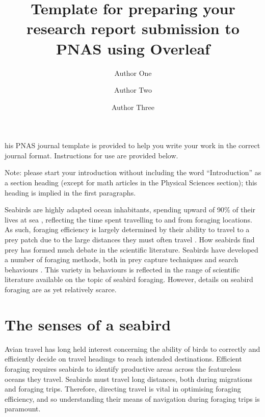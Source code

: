 \documentclass[9pt,twocolumn,twoside,lineno]{pnas-new}
\title{Template for preparing your research report submission to PNAS using Overleaf}
\author[a,c,1]{Author One}
\author[b,1,2]{Author Two}
\author[a]{Author Three}
\affil[a]{Affiliation One}
\affil[b]{Affiliation Two}
\affil[c]{Affiliation Three}
\begin{document}
\maketitle
\thispagestyle{firststyle}

his PNAS journal template is provided to help you write your work in the correct journal format. Instructions for use are provided below. 

Note: please start your introduction without including the word ``Introduction'' as a section heading (except for math articles in the Physical Sciences section); this heading is implied in the first paragraphs. 

Seabirds are highly adapted ocean inhabitants, spending upward of 90\% of their lives at sea \citep{Balance_2019}, reflecting the time spent travelling to and from foraging locations. As such, foraging efficiency is largely determined by their ability to travel to a prey patch due to the large distances they must often travel \citep{Weimerskirch_2003}. How seabirds find prey has formed much debate in the scientific literature. Seabirds have developed a number of foraging methods, both in prey capture techniques and search behaviours \citep{Shealer_2001}. This variety in behaviours is reflected in the range of scientific literature available on the topic of seabird foraging. However, details on seabird foraging are as yet relatively scarce. 

\section{The senses of a seabird}
Avian travel has long held interest concerning the ability of birds to correctly and efficiently decide on travel headings to reach intended destinations. Efficient foraging requires seabirds to identify productive areas across the featureless oceans they travel. Seabirds must travel long distances, both during migrations and foraging trips. Therefore, directing travel is vital in optimising foraging efficiency, and so understanding their means of navigation during foraging trips is paramount.

\end{document}

